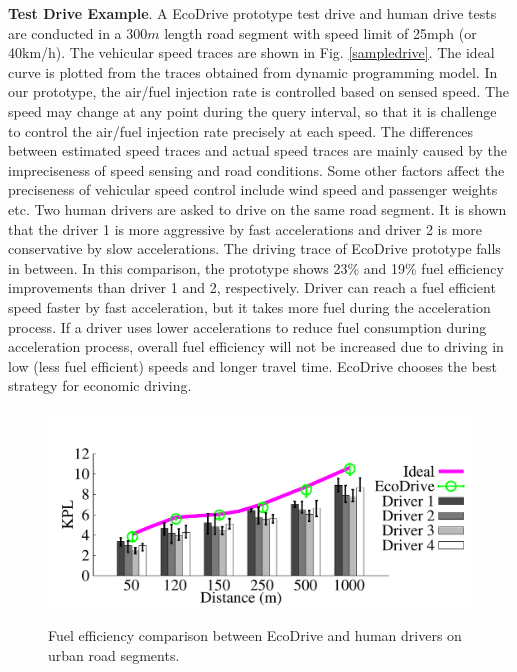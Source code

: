 \textbf{Test Drive Example}. 
A EcoDrive prototype test drive and human drive tests are conducted in a $300m$ length
road segment with speed limit of 25mph (or 40km/h). 
The vehicular speed traces are shown in Fig. \ref{sampledrive}. 
The ideal curve is plotted from the traces obtained from dynamic programming model. 
In our prototype, the air/fuel injection rate is controlled based
on sensed speed. 
The speed may change at any point during the query interval, 
so that it is challenge to control the air/fuel injection rate precisely at each speed. 
The differences between estimated speed traces and
actual speed traces are mainly caused by the impreciseness of 
speed sensing and road conditions.  
Some other factors affect the preciseness of vehicular speed 
control include wind speed and passenger
weights etc. 
Two human drivers are asked to drive 
on the same road segment. 
It is shown that the driver 1 is more aggressive by fast accelerations
and driver 2 is more conservative by slow accelerations. 
The driving trace of EcoDrive prototype falls in between. 
In this comparison, the prototype shows 23\% and 19\% fuel
efficiency improvements than driver 1 and 2, respectively. 
Driver can reach a fuel efficient speed faster by fast acceleration, 
but it takes more fuel during the acceleration process.  
If a driver uses lower accelerations to reduce fuel consumption
during acceleration process, overall fuel efficiency will not be increased due to driving in low (less fuel efficient) speeds
and longer travel time.
EcoDrive chooses the best strategy for economic driving. 




\begin{figure}[ht]
\begin{center}
\vspace{-0.5cm}
\includegraphics[width=5.0in,angle=0]{Figs/EcoDrive/evaluation/urbansegments.pdf}
\vspace{-0.0cm}
\caption{Fuel efficiency comparison between EcoDrive and human drivers on urban road segments. }
\vspace{-0.7cm}
\label{urbansegments}
\end{center}
\end{figure}

